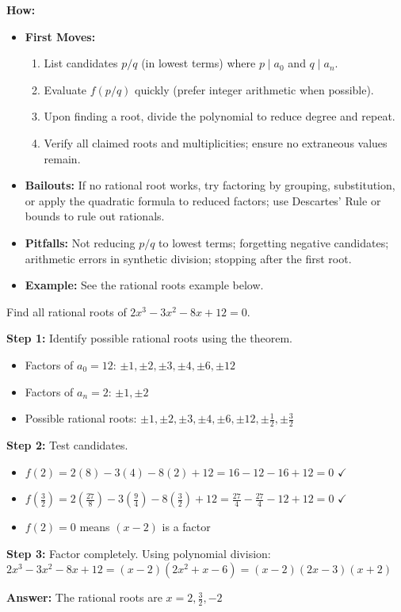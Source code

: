 \documentclass[12pt]{article}
\newenvironment{problem}[1]
{\begin{tcolorbox}[colback=blue!5!white,colframe=blue!75!black,title={#1}]}{\end{tcolorbox}}
\newenvironment{solution}
{\begin{tcolorbox}[colback=green!5!white,colframe=green!75!black,title={Solution}]}{\end{tcolorbox}}
\begin{document}
\textbf{How:}
\begin{itemize}
    \item \textbf{First Moves:}
    \begin{enumerate}[nosep]
        \item List candidates $p/q$ (in lowest terms) where $p\mid a_0$ and $q\mid a_n$.
        \item Evaluate $f(p/q)$ quickly (prefer integer arithmetic when possible).
        \item Upon finding a root, divide the polynomial to reduce degree and repeat.
        \item Verify all claimed roots and multiplicities; ensure no extraneous values remain.
    \end{enumerate}
    \item \textbf{Bailouts:} If no rational root works, try factoring by grouping, substitution, or apply the quadratic formula to reduced factors; use Descartes' Rule or bounds to rule out rationals.
    \item \textbf{Pitfalls:} Not reducing $p/q$ to lowest terms; forgetting negative candidates; arithmetic errors in synthetic division; stopping after the first root.
    \item \textbf{Example:} See the rational roots example below.
\end{itemize}

\begin{problem}{Example: Finding Rational Roots}
Find all rational roots of $2x^3 - 3x^2 - 8x + 12 = 0$.
\end{problem}

\begin{solution}
\textbf{Step 1:} Identify possible rational roots using the theorem.
\begin{itemize}
    \item Factors of $a_0 = 12$: $\pm 1, \pm 2, \pm 3, \pm 4, \pm 6, \pm 12$
    \item Factors of $a_n = 2$: $\pm 1, \pm 2$
    \item Possible rational roots: $\pm 1, \pm 2, \pm 3, \pm 4, \pm 6, \pm 12, \pm \frac{1}{2}, \pm \frac{3}{2}$
\end{itemize}

\textbf{Step 2:} Test candidates.
\begin{itemize}
    \item $f(2) = 2(8) - 3(4) - 8(2) + 12 = 16 - 12 - 16 + 12 = 0$ $\checkmark$
    \item $f\left(\frac{3}{2}\right) = 2\left(\frac{27}{8}\right) - 3\left(\frac{9}{4}\right) - 8\left(\frac{3}{2}\right) + 12 = \frac{27}{4} - \frac{27}{4} - 12 + 12 = 0$ $\checkmark$
    \item $f(2) = 0$ means $(x - 2)$ is a factor
\end{itemize}

\textbf{Step 3:} Factor completely.
Using polynomial division: $2x^3 - 3x^2 - 8x + 12 = (x - 2)(2x^2 + x - 6) = (x - 2)(2x - 3)(x + 2)$

\textbf{Answer:} The rational roots are $x = 2, \frac{3}{2}, -2$
\end{solution}
\end{document}

